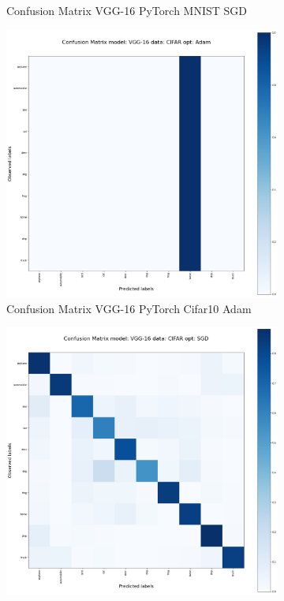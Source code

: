 \documentclass[conference]{IEEEtran}
\begin{document}
\begin{figure}[!htbp]
\begin{subfigure}[b]{0.21\textwidth}
        \caption{Confusion Matrix VGG-16 PyTorch MNIST SGD}
        \label{fig:x matrix_GG-16_PyTorch_MNIST_SGD}
    \end{subfigure}
    \begin{subfigure}[b]{0.22\textwidth}
        \centering
        \includegraphics[width=\textwidth]{img/matrix_vgg_torch_CIFAR_Adam.png}
        \caption{Confusion Matrix VGG-16 PyTorch Cifar10 Adam}
        \label{fig:x matrix_VGG-16_PyTorch_CIFAR_Adam}
    \end{subfigure}
    \hfill
    \begin{subfigure}[b]{0.22\textwidth}
        \centering
        \includegraphics[width=\textwidth]{img/matrix_vgg_torch_CIFAR_SGD.png}

\end{subfigure}
\end{figure}
\end{document}
